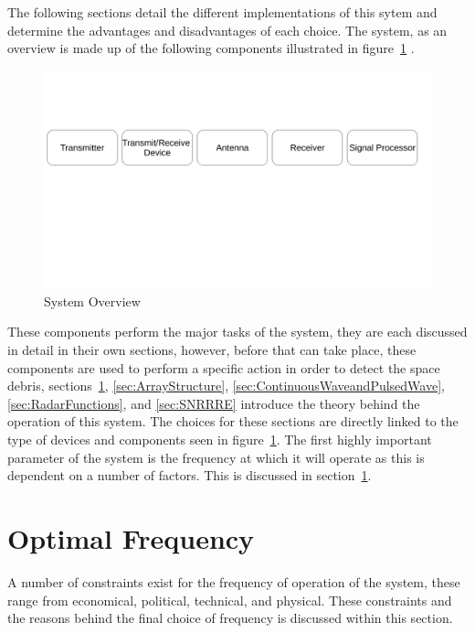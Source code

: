 \documentclass[11pt]{witseiepaper}
\begin{document}
The following sections detail the different implementations of this sytem and determine the advantages and disadvantages of each choice.
The system, as an overview is made up of the following components illustrated in figure~\ref{fig:SystemOverview} \cite{radarHandbook}.

\begin{center}
    \begin{figure}
        \includegraphics[width=\textwidth]{SystemOverview.pdf}
        \caption{System Overview}
        \label{fig:SystemOverview}    
    \end{figure}
\end{center}
These components perform the major tasks of the system, they are each discussed in detail in their own sections, however, before that can take place, these components are used to perform a specific action in order to detect the space debris, sections~\ref{sec:OptimalFrequency}, \ref{sec:ArrayStructure}, \ref{sec:ContinuousWaveandPulsedWave}, \ref{sec:RadarFunctions}, and \ref{sec:SNRRRE} introduce the theory behind the operation of this system. The choices for these sections are directly linked to the type of devices and components seen in figure~\ref{fig:SystemOverview}.
The first highly important parameter of the system is the frequency at which it will operate as this is dependent on a number of factors. This is discussed in section~\ref{sec:OptimalFrequency}.


\section{Optimal Frequency} \label{sec:OptimalFrequency}
A number of constraints exist for the frequency of operation of the system, these range from economical, political, technical, and physical. These constraints and the reasons behind the final choice of frequency is discussed within this section.
\end{document}
